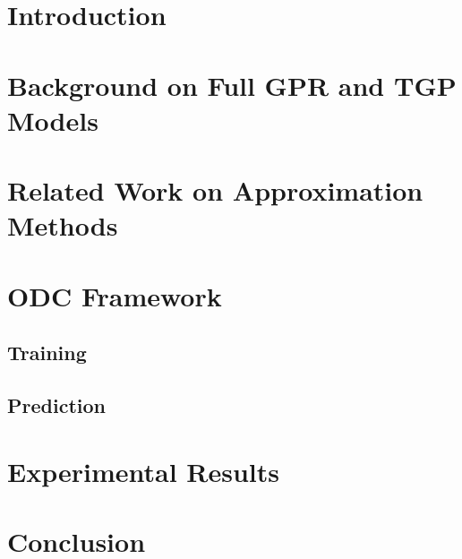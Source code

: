 \date{Received: date / Accepted: date}


\maketitle



\section{Introduction}
\label{sec:1}


\section{Background on Full GPR and TGP Models}
\label{sec:2}



\section{Related Work on Approximation  Methods}
\label{sec:relappmethod}


\section{ODC Framework}%
\label{sec:3}



\subsection{Training}
\label{sec:4}



\subsection{Prediction}
\label{sec:pred}


\section{Experimental Results}
\label{sec:6}


\section{Conclusion}
\label{sec:7}


%



